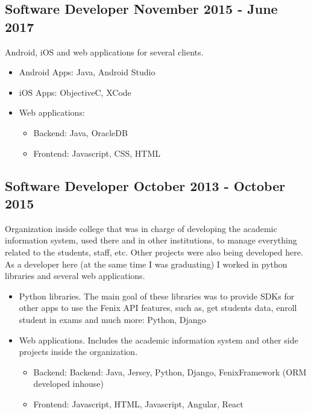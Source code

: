 \subsection{{Software Developer \hfill November 2015 - June 2017}}
\begin{zitemize}
\item Android, iOS and web applications for several clients.
\begin{itemize}
    \item Android Apps: Java, Android Studio
    \item iOS Apps: ObjectiveC, XCode
    \item Web applications:
    \begin{itemize}
        \item Backend: Java, OracleDB
	    \item Frontend: Javascript, CSS, HTML
    \end{itemize}
\end{itemize}
\end{zitemize}

\subsection{{Software Developer \hfill October 2013 - October 2015}}
\begin{zitemize}
\item Organization inside college that was in charge of developing 
the academic information system, 
used there and in other institutions, to manage everything
related to the students, staff, etc. 
Other projects were also being developed here. 
As a developer here (at the same time I was graduating) 
I worked in python libraries and several web applications.
\begin{itemize}
    \item Python libraries. The main goal of these libraries was to provide
    SDKs for other apps to use the Fenix API features, such as, get
    students data, enroll student in exams and much more: Python, Django
    \item Web applications. Includes the academic information system
    and other side projects inside the organization.
    \begin{itemize}
        \item Backend: Backend: Java, Jersey, Python, Django, FenixFramework (ORM developed inhouse)
        \item Frontend: Javascript, HTML, Javascript, Angular, React
    \end{itemize}
\end{itemize}
\end{zitemize}

